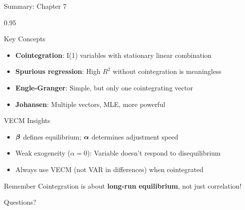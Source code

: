 \documentclass[9pt, aspectratio=169, t]{beamer}
\begin{document}
\begin{frame}{Summary: Chapter 7}
    \begin{cminipage}{0.95\textwidth}
    \vspace{-0.5cm}
    {\footnotesize
    \begin{exampleblock}{Key Concepts}
        \begin{itemize}\setlength{\itemsep}{1pt}
            \item[\textcolor{MainBlue}{\textbf{1.}}] \textbf{Cointegration}: I(1) variables with stationary linear combination
            \item[\textcolor{MainBlue}{\textbf{2.}}] \textbf{Spurious regression}: High $R^2$ without cointegration is meaningless
            \item[\textcolor{MainBlue}{\textbf{3.}}] \textbf{Engle-Granger}: Simple, but only one cointegrating vector
            \item[\textcolor{MainBlue}{\textbf{4.}}] \textbf{Johansen}: Multiple vectors, MLE, more powerful
        \end{itemize}
    \end{exampleblock}
    \begin{exampleblock}{VECM Insights}
        \begin{itemize}\setlength{\itemsep}{0pt}
            \item $\boldsymbol{\beta}$ defines equilibrium; $\boldsymbol{\alpha}$ determines adjustment speed
            \item Weak exogeneity ($\alpha = 0$): Variable doesn't respond to disequilibrium
            \item Always use VECM (not VAR in differences) when cointegrated
        \end{itemize}
    \end{exampleblock}
    \begin{alertblock}{Remember}
        Cointegration is about \textbf{long-run equilibrium}, not just correlation!
    \end{alertblock}
    }

    \vspace{0.1cm}
    \begin{center}
        \Large\textcolor{MainBlue}{Questions?}
    \end{center}
    \end{cminipage}
\end{frame}
\end{document}
